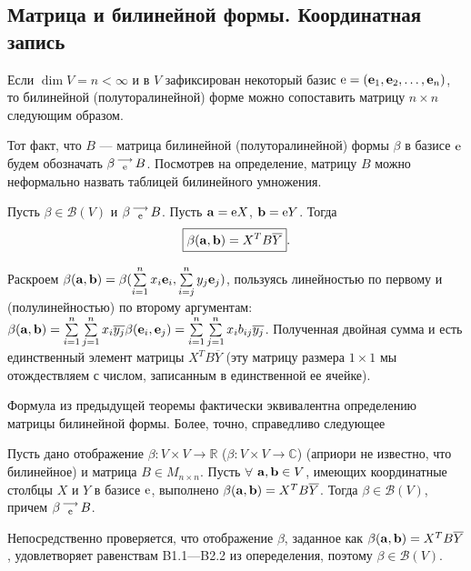 \subsection{Матрица и билинейной формы. Координатная запись}

Если $\dim V=n<\infty$ и в $V$ зафиксирован некоторый базис $\mathrm{e}=(\mathbf{e}_1, \mathbf{e}_2, \ldots , \mathbf{e}_n)$,
то билинейной (полуторалинейной) форме можно сопоставить матрицу $n\times n$ следующим образом.


Тот факт, что $B$ --- матрица билинейной (полуторалинейной) формы $\beta$
в базисе $\mathrm{e}$ будем обозначать $\beta \begin{smallmatrix} \longrightarrow \\ \mathrm{e} \end{smallmatrix} B$.
Посмотрев на определение, матрицу $B$ можно неформально назвать таблицей билинейного умножения.



\begin{theor}\label{t9_1_1}
Пусть $\beta \in \mathcal{B} (V)$ и $\beta \begin{smallmatrix} \longrightarrow \\ \mathrm{e} \end{smallmatrix} B$. 
Пусть $\mathbf{a}= \mathrm{e} X$, $\mathbf{b}= \mathrm{e} Y$.
Тогда $$\boxed{ \beta (\mathbf{a}, \mathbf{b}) = X^T B \overline{Y}} .$$
\end{theor}
\dok Раскроем $\beta (\mathbf{a}, \mathbf{b}) = \beta (\sum \limits_{i=1}^n  x_i \mathbf{e}_i, \sum \limits_{i=j}^n  y_j \mathbf{e}_j) $, пользуясь линейностью по первому и (полулинейностью)
по второму аргументам: \\
$\beta (\mathbf{a}, \mathbf{b}) = \sum \limits_{i=1}^n \sum \limits_{j=1}^n x_i \overline{y_j} \beta (\mathbf{e}_i, \mathbf{e}_j) 
= \sum \limits_{i=1}^n \sum \limits_{j=1}^n x_i b_{ij} \overline{y_j} $. Полученная двойная сумма и есть единственный элемент матрицы  $X^T B \overline{Y}$ 
(эту матрицу размера $1\times 1$ мы отождествляем с числом, записанным в единственной ее ячейке).
\edok

\otstup

Формула из предыдущей теоремы фактически эквивалентна определению матрицы билинейной формы.
Более, точно, справедливо следующее %
%

\begin{predl}\label{p9_1_2}
Пусть дано отображение $\beta :V\times V \to \mathbb{R}$ ($\beta :V\times V \to \mathbb{C}$)
(априори не известно, что билинейное) 
и матрица $B \in M_{n\times n}$.
Пусть $\forall$ $\mathbf{a}, \mathbf{b} \in V$, имеющих координатные столбцы $X$ и $Y$  в базисе $\mathrm{e}$, 
выполнено $\beta (\mathbf{a}, \mathbf{b}) = X^T B \overline{Y}$. Тогда $\beta \in \mathcal{B} (V)$, причем
$\beta \begin{smallmatrix} \longrightarrow \\ \mathrm{e} \end{smallmatrix} B$.
\end{predl}
\dok Непосредственно проверяется, что отображение $\beta$, заданное как  $\beta (\mathbf{a}, \mathbf{b}) = X^T B \overline{Y}$,
удовлетворяет равенствам B1.1---B2.2 из опеределения, поэтому $\beta \in \mathcal{B} (V)$.

